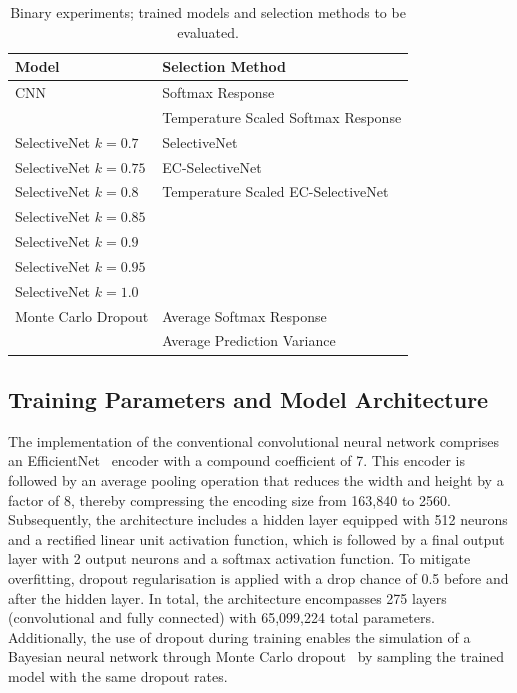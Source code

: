\begin{table}[h]
	\centering
	\caption{Binary experiments; trained models and selection methods to be evaluated.}
	\label{tab:binary-experiment-setup}
	\begin{tabular}{|l|l|}
		\hline
		Model & Selection Method \\ \hline
		CNN & Softmax Response \\
		& Temperature Scaled Softmax Response \\ \hline
		SelectiveNet $k=0.7$ & SelectiveNet \\
		SelectiveNet $k=0.75$ & EC-SelectiveNet \\
		SelectiveNet $k=0.8$ & Temperature Scaled EC-SelectiveNet \\
		SelectiveNet $k=0.85$ &  \\
		SelectiveNet $k=0.9$ &  \\
		SelectiveNet $k=0.95$ &  \\
		SelectiveNet $k=1.0$ &  \\ \hline
		Monte Carlo Dropout & Average Softmax Response \\
		& Average Prediction Variance \\ \hline
	\end{tabular}
\end{table}


\subsection{Training Parameters and Model Architecture}
\label{subsec:selective_binary_training}
The implementation of the conventional convolutional neural network comprises an EfficientNet~\citep{tan2019efficientnet} encoder with a compound coefficient of 7. This encoder is followed by an average pooling operation that reduces the width and height by a factor of 8, thereby compressing the encoding size from 163,840 to 2560. Subsequently, the architecture includes a hidden layer equipped with 512 neurons and a rectified linear unit activation function, which is followed by a final output layer with 2 output neurons and a softmax activation function. To mitigate overfitting, dropout regularisation is applied with a drop chance of 0.5 before and after the hidden layer. In total, the architecture encompasses 275 layers (convolutional and fully connected) with 65,099,224 total parameters. Additionally, the use of dropout during training enables the simulation of a Bayesian neural network through Monte Carlo dropout~\citep{gal2016dropout} by sampling the trained model with the same dropout rates.

